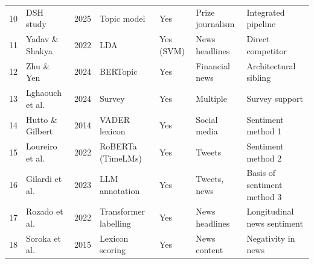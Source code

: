 \begin{table}[p]
\begin{tabular}{@{}r p{2.5cm} c p{2.1cm} p{1.4cm} p{2.0cm} p{3.0cm}@{}}
10 & DSH study         & 2025 & Topic model     & Yes       & Prize journalism & Integrated pipeline\\
11 & Yadav \& Shakya   & 2022 & LDA             & Yes (SVM) & News headlines   & Direct competitor\\
12 & Zhu \& Yen        & 2024 & BERTopic        & Yes       & Financial news   & Architectural sibling\\
13 & Lghaouch et al.   & 2024 & Survey          & Yes       & Multiple         & Survey support\\
\midrule
14 & Hutto \& Gilbert  & 2014 & VADER lexicon   & Yes       & Social media     & Sentiment method 1\\
15 & Loureiro et al.   & 2022 & RoBERTa (TimeLMs) & Yes     & Tweets           & Sentiment method 2\\
16 & Gilardi et al.    & 2023 & LLM annotation  & Yes       & Tweets, news     & Basis of sentiment method 3\\
17 & Rozado et al.     & 2022 & Transformer labelling & Yes & News headlines   & Longitudinal news sentiment\\
18 & Soroka et al.     & 2015 & Lexicon scoring & Yes       & News content     & Negativity in news\\
\bottomrule
\end{tabular}
\end{table}
